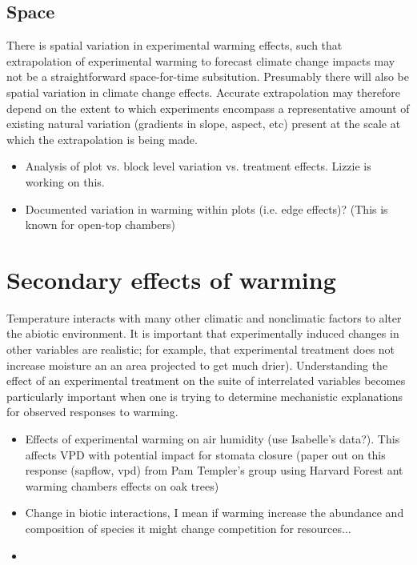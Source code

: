 \documentclass{article}
\begin{document}
\subsection {Space}
There is spatial variation in experimental warming effects, such that extrapolation of experimental warming to forecast climate change impacts may not be a straightforward space-for-time subsitution. Presumably there will also be spatial variation in climate change effects.  Accurate extrapolation may therefore depend on the extent to which experiments encompass a representative amount of existing natural variation (gradients in slope, aspect, etc) present at the scale at which the extrapolation is being made.%
\begin{itemize}
\item Analysis of plot vs. block level variation vs. treatment effects. Lizzie is working on this.
\item Documented variation in warming within plots (i.e. edge effects)? (This is known for open-top chambers)
\end{itemize}

\section {Secondary effects of warming}
Temperature interacts with many other climatic and nonclimatic factors to alter the abiotic environment. It is important that experimentally induced changes in other variables are realistic; for example, that experimental treatment does not increase moisture an an area projected to get much drier). Understanding the effect of an experimental treatment on the suite of interrelated variables becomes particularly  important when one is trying to determine mechanistic explanations for observed responses to warming.
\begin{itemize}
\item Effects of experimental warming on air humidity (use Isabelle's data?). This affects VPD with potential impact for stomata closure (paper out on this response (sapflow, vpd) from Pam Templer's group using Harvard Forest ant warming chambers effects on oak trees)
\item Change in biotic interactions, I mean if warming increase the abundance and composition of species it might change competition for resources...
\item 
\end{itemize}
\end{document}
